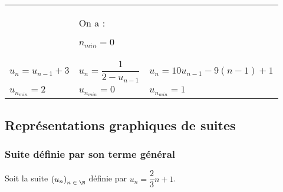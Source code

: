 \begin{tabular}{lll}
& 

\hspace*{-.3cm}

On a :

$n_{min} = 0$ \\

\hspace*{-1cm}

$u_n = u_{n-1} +3$ & 

\hspace*{.4cm}

$u_n = \dfrac{1}{2 - u_{n-1}}$ & 

\hspace*{.7cm}

$u_n = 10u_{n-1} - 9\left(n-1\right) + 1$  \\

\hspace*{-1cm}

$u_{n_{min}} = 2$ & 

\hspace*{.4cm}

$u_{n_{min}} = 0$ & 

\hspace*{.7cm}

$u_{n_{min}} = 1$ \\

\end{tabular}

\newpage

\subsection{Représentations graphiques de suites}

\subsubsection{Suite définie par son terme général}

Soit la suite $\left(u_n\right)_{n \; \in \; \N}$ définie par $u_n = \dfrac{2}{3}n + 1$. \\






